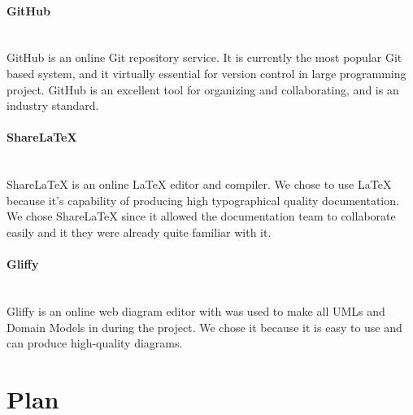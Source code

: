 \documentclass[12pt]{article}
\begin{document}
\paragraph*{GitHub}~\\
GitHub is an online Git repository service. It is currently the most popular Git based system, and it virtually essential for version control in large programming project. GitHub is an excellent tool for organizing and collaborating, and is an industry standard.
%
\paragraph*{ShareLaTeX}~\\
ShareLaTeX is an online LaTeX editor and compiler. We chose to use LaTeX because it's capability of producing high typographical quality documentation. We chose ShareLaTeX since it allowed the documentation team to collaborate easily and it they were already quite familiar with it. 
%
\paragraph*{Gliffy}~\\
Gliffy is an online web diagram editor with was used to make all UMLs and Domain Models in during the project. We chose it because it is easy to use and can produce high-quality diagrams.
%
\vfill
\newpage
\section{Plan}


\vfill
\newpage
\end{document}
